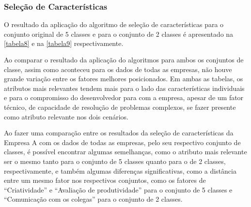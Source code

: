 \subsubsection{Seleção de Características}
O resultado da aplicação do algoritmo de seleção de características para o conjunto original de 5 classes e para o conjunto de 2 classes é apresentado na \autoref{tabela8} e na \autoref{tabela9} respectivamente.

Ao comparar o resultado da aplicação do algoritmos para ambos os conjuntos de classe, assim como aconteceu para os dados de todas as empresas, não houve grande variação entre os fatores melhores posicionados. Em ambas as tabelas, os atributos mais relevantes tendem mais para o lado das características individuais e para o compromisso do desenvolvedor para com a empresa, apesar de um fator técnico, de capacidade de resolução de problemas complexos, se fazer presente como atributo relevante nos dois cenários.

Ao fazer uma comparação entre os resultados da seleção de características da Empresa A com os dados de todas as empresas, pelo seu respectivo conjunto de classes, é possível encontrar algumas semelhanças, como o atributo mais relevante ser o mesmo tanto para o conjunto de 5 classes quanto para o de 2 classes, respectivamente, e também algumas diferenças significativas, como a distância entre um mesmo fator nos respectivos conjuntos, como os fatores de ``Criatividade'' e ``Avaliação de produtividade'' para o conjunto de 5 classes e ``Comunicação com os colegas'' para o conjunto de 2 classes.

